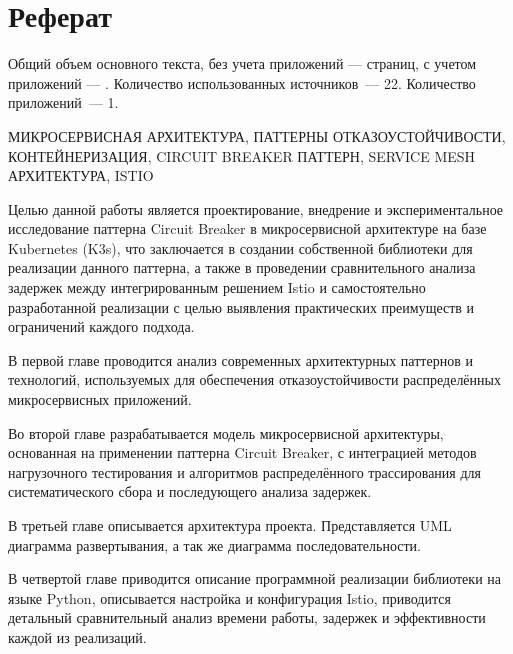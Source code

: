 \chapter*{Реферат}
\thispagestyle{plain}
Общий объем основного текста, без учета приложений ---
\pageref{end_of_main_text} страниц, с учетом приложений ---
\pageref{end_of_document}. Количество использованных источников~--- 22.
Количество приложений~--- 1.

\noindent \uppercase{микросервисная архитектура, паттерны отказоустойчивости, контейнеризация, circuit breaker паттерн, service mesh архитектура, Istio}

Целью данной работы является проектирование, внедрение и экспериментальное исследование паттерна Circuit Breaker в микросервисной архитектуре на базе Kubernetes (K3s), что заключается в создании собственной библиотеки для реализации данного паттерна, а также в проведении сравнительного анализа задержек между интегрированным решением Istio и самостоятельно разработанной реализации с целью выявления практических преимуществ и ограничений каждого подхода.

В первой главе проводится анализ современных архитектурных паттернов и технологий, используемых для обеспечения отказоустойчивости распределённых микросервисных приложений.

Во второй главе разрабатывается модель микросервисной архитектуры, основанная на применении паттерна Circuit Breaker, с интеграцией методов нагрузочного тестирования и алгоритмов распределённого трассирования для систематического сбора и последующего анализа задержек.

В третьей главе описывается архитектура проекта. Представляется UML диаграмма развертывания, а так же диаграмма последовательности.

В четвертой главе приводится описание программной реализации библиотеки на языке Python, описывается настройка и конфигурация Istio, приводится детальный сравнительный анализ времени работы, задержек и эффективности каждой из реализаций.




